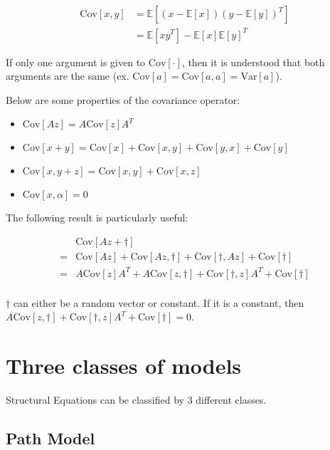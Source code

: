 \documentclass{article}
\begin{document}
\begin{multicols*}{2}
\[\begin{aligned}
    \textrm{Cov}[x, y] &= \mathbb{E}\left[(x - \mathbb{E}[x])(y - \mathbb{E}[y])^T\right] \\
    & = \mathbb{E}\left[xy^T\right] - \mathbb{E}[x]\mathbb{E}[y]^T
\end{aligned}\]

If only one argument is given to $\textrm{Cov}[\cdot]$, then it is understood that both arguments are the same (ex. $\textrm{Cov}[a] = \textrm{Cov}[a, a] = \textrm{Var}[a]$).

Below are some properties of the covariance operator:

\begin{itemize}
    \item $\textrm{Cov}[Az] = A \textrm{Cov}[z] A^T$
    \item $\textrm{Cov}[x+y] = \textrm{Cov}[x] + \textrm{Cov}[x, y] + \textrm{Cov}[y, x] + \textrm{Cov}[y]$
    \item $\textrm{Cov}[x,y+z] = \textrm{Cov}[x,y] + \textrm{Cov}[x, z]$
    \item $\textrm{Cov}[x,\alpha] = 0$
\end{itemize}

The following result is particularly useful:

\[\begin{aligned}
    &\textrm{Cov}[Az+\dagger]\\
    =& \textrm{Cov}[Az] + \textrm{Cov}[Az,\dagger] + \textrm{Cov}[\dagger, Az] + \textrm{Cov}[\dagger]\\
    =& A\textrm{Cov}[z]A^T + A\textrm{Cov}[z,\dagger] + \textrm{Cov}[\dagger, z]A^T + \textrm{Cov}[\dagger]\\
\end{aligned}\]

$\dagger$ can either be a random vector or constant. If it is a constant, then $A\textrm{Cov}[z,\dagger] + \textrm{Cov}[\dagger, z]A^T + \textrm{Cov}[\dagger] = 0$.

\section{Three classes of models}

Structural Equations can be classified by 3 different classes.

\subsection{Path Model}


\end{multicols*}
\end{document}
